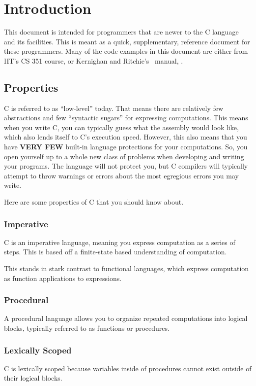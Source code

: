 \section{Introduction}\label{sec:Intro}
This document is intended for programmers that are newer to the C language and its facilities.
This is meant as a quick, supplementary, reference document for these programmers.
Many of the code examples in this document are either from IIT's CS 351 course, or Kernighan and Ritchie's~\cite{KernighanRitchieCProg} manual, .

\subsection{Properties}\label{subsec:Properties}
C is referred to as ``low-level'' today.
That means there are relatively few abstractions and few ``syntactic sugars'' for expressing computations.
This means when you write C, you can typically guess what the assembly would look like, which also lends itself to C's execution speed.
However, this also means that you have \textbf{VERY FEW} built-in language protections for your computations.
So, you open yourself up to a whole new class of problems when developing and writing your programs.
The language will not protect you, but C compilers will typically attempt to throw warnings or errors about the most egregious errors you may write.

Here are some properties of C that you should know about.

\subsubsection{Imperative}\label{subsubsec:Imperative}
C is an imperative language, meaning you express computation as a series of steps.
This is based off a finite-state based understanding of computation.

This stands in stark contrast to functional languages, which express computation as function applications to expressions.

\subsubsection{Procedural}\label{subsubsec:Procedural}
A procedural language allows you to organize repeated computations into logical blocks, typically referred to as functions or procedures.

\subsubsection{Lexically Scoped}\label{subsubsec:Lexically_Scoped}
C is lexically scoped because variables inside of procedures cannot exist outside of their logical blocks.

